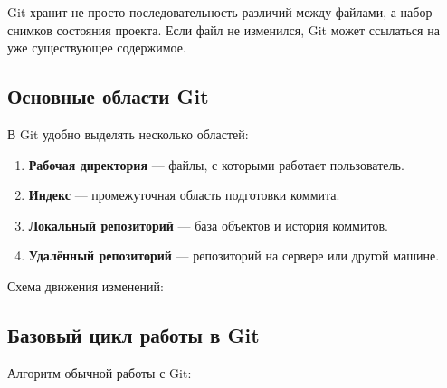 \documentclass[12pt,a4paper]{article}
\begin{document}
Git хранит не просто последовательность различий между файлами, а набор снимков состояния проекта. Если файл не изменился, Git может ссылаться на уже существующее содержимое.

\subsection{Основные области Git}

В Git удобно выделять несколько областей:

\begin{enumerate}
    \item \textbf{Рабочая директория} --- файлы, с которыми работает пользователь.
    \item \textbf{Индекс} --- промежуточная область подготовки коммита.
    \item \textbf{Локальный репозиторий} --- база объектов и история коммитов.
    \item \textbf{Удалённый репозиторий} --- репозиторий на сервере или другой машине.
\end{enumerate}

Схема движения изменений:

\begin{center}
\end{center}

\subsection{Базовый цикл работы в Git}

Алгоритм обычной работы с Git:
\end{document}
